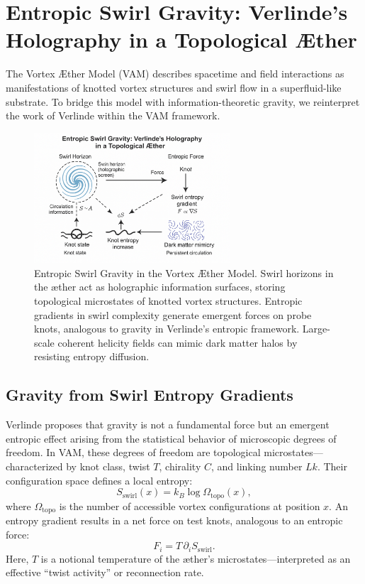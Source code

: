 \section{Entropic Swirl Gravity: Verlinde’s Holography in a Topological Æther}

The Vortex Æther Model (VAM) describes spacetime and field interactions as manifestations of knotted vortex structures and swirl flow in a superfluid-like substrate. To bridge this model with information-theoretic gravity, we reinterpret the work of Verlinde \cite{Verlinde2011,Verlinde2016} within the VAM framework.

\begin{figure}[h!]
\centering
\includegraphics[width=0.65\textwidth]{images/ErikVerlinde}
\caption{Entropic Swirl Gravity in the Vortex Æther Model.
Swirl horizons in the æther act as holographic information surfaces, storing topological microstates of knotted vortex structures. Entropic gradients in swirl complexity generate emergent forces on probe knots, analogous to gravity in Verlinde’s entropic framework. Large-scale coherent helicity fields can mimic dark matter halos by resisting entropy diffusion.}
\end{figure}

\subsection*{Gravity from Swirl Entropy Gradients}

Verlinde proposes that gravity is not a fundamental force but an emergent entropic effect arising from the statistical behavior of microscopic degrees of freedom. In VAM, these degrees of freedom are topological microstates—characterized by knot class, twist $T$, chirality $C$, and linking number $Lk$. Their configuration space defines a local entropy:
\begin{equation}
S_{\text{swirl}}(x) = k_B \log \Omega_{\text{topo}}(x),
\end{equation}
where $\Omega_{\text{topo}}$ is the number of accessible vortex configurations at position $x$. An entropy gradient results in a net force on test knots, analogous to an entropic force:
\begin{equation}
F_i = T \, \partial_i S_{\text{swirl}}.
\end{equation}
Here, $T$ is a notional temperature of the æther's microstates—interpreted as an effective “twist activity” or reconnection rate.

